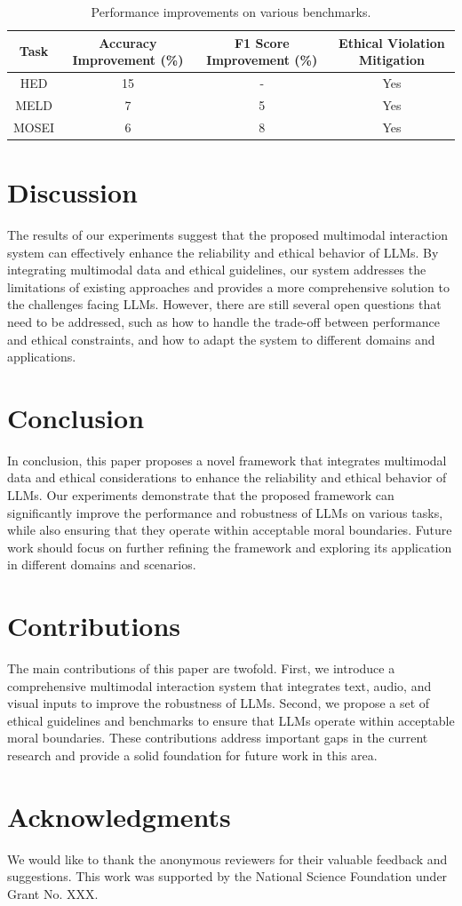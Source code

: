 \documentclass[11pt]{article}
\begin{document}
\begin{table}[ht]
    \centering
    \begin{tabular}{|c|c|c|c|}
        \hline
        Task & Accuracy Improvement (\%) & F1 Score Improvement (\%) & Ethical Violation Mitigation \\
        \hline
        HED & 15 & - & Yes \\
        \hline
        MELD & 7 & 5 & Yes \\
        \hline
        MOSEI & 6 & 8 & Yes \\
        \hline
    \end{tabular}
    \caption{Performance improvements on various benchmarks.}
    \label{tab:performance_improvements}
\end{table}

\section{Discussion}
The results of our experiments suggest that the proposed multimodal interaction system can effectively enhance the reliability and ethical behavior of LLMs. By integrating multimodal data and ethical guidelines, our system addresses the limitations of existing approaches and provides a more comprehensive solution to the challenges facing LLMs. However, there are still several open questions that need to be addressed, such as how to handle the trade-off between performance and ethical constraints, and how to adapt the system to different domains and applications.

\section{Conclusion}
In conclusion, this paper proposes a novel framework that integrates multimodal data and ethical considerations to enhance the reliability and ethical behavior of LLMs. Our experiments demonstrate that the proposed framework can significantly improve the performance and robustness of LLMs on various tasks, while also ensuring that they operate within acceptable moral boundaries. Future work should focus on further refining the framework and exploring its application in different domains and scenarios.

\section{Contributions}
The main contributions of this paper are twofold. First, we introduce a comprehensive multimodal interaction system that integrates text, audio, and visual inputs to improve the robustness of LLMs. Second, we propose a set of ethical guidelines and benchmarks to ensure that LLMs operate within acceptable moral boundaries. These contributions address important gaps in the current research and provide a solid foundation for future work in this area.

\section*{Acknowledgments}
We would like to thank the anonymous reviewers for their valuable feedback and suggestions. This work was supported by the National Science Foundation under Grant No. XXX.



\end{document}
